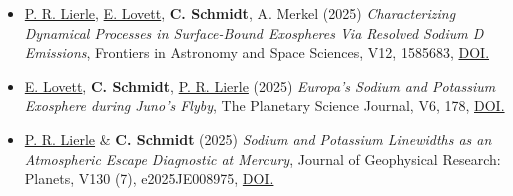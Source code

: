 \documentclass[12pt]{report}
\begin{document}
\begin{itemize}
  \item \underline{P. R. Lierle}, \underline{E. Lovett}, \textbf{C. Schmidt}, A. Merkel (2025) \textit{Characterizing Dynamical Processes in Surface-Bound Exospheres Via Resolved Sodium D Emissions}, Frontiers in Astronomy and Space Sciences, V12, 1585683, \href{https://doi.org/10.3389/fspas.2025.1585683}{DOI.} 
  \item \underline{E. Lovett}, \textbf{C. Schmidt}, \underline{P. R. Lierle} (2025) \textit{Europa’s Sodium and Potassium Exosphere during Juno’s Flyby}, The Planetary Science Journal, V6, 178, \href{https://doi.org/10.3847/PSJ/adeb52}{DOI.} 
  \item \underline{P. R. Lierle} \& \textbf{C. Schmidt} (2025) \textit{Sodium and Potassium Linewidths as an Atmospheric Escape Diagnostic at Mercury}, Journal of Geophysical Research: Planets, V130 (7), e2025JE008975, \href{https://doi.org/10.1029/2025JE008975}{DOI.}

\end{itemize}
\end{document}
